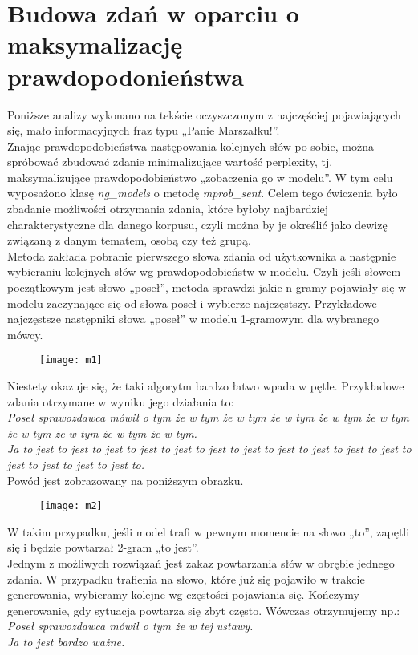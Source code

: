 \documentclass[a4paper,11pt,twoside]{report}
\theoremstyle{definition}
\begin{document}
\section{Budowa zdań w oparciu o maksymalizację prawdopodonieństwa}
Poniższe analizy wykonano na tekście oczyszczonym z najczęściej pojawiających się, mało informacyjnych fraz typu „Panie Marszałku!”. \\
Znając prawdopodobieństwa następowania kolejnych słów po sobie, można spróbować zbudować zdanie minimalizujące wartość perplexity, tj. maksymalizujące prawdopodobieństwo „zobaczenia go w modelu”. W tym celu wyposażono klasę \textit{ng\_models} o metodę \textit{mprob\_sent}. Celem tego ćwiczenia było zbadanie możliwości otrzymania zdania, które byłoby najbardziej charakterystyczne dla danego korpusu, czyli można by je określić jako dewizę związaną z danym tematem, osobą czy też grupą. \\
Metoda zakłada pobranie pierwszego słowa zdania od użytkownika a następnie wybieraniu kolejnych słów wg prawdopodobieństw w modelu. Czyli jeśli słowem początkowym jest słowo „poseł”, metoda sprawdzi jakie n-gramy pojawiały się w modelu zaczynające się od słowa poseł i wybierze najczęstszy. Przykładowe najczęstsze następniki słowa „poseł” w modelu 1-gramowym dla wybranego mówcy.\\

\begin{figure}[h] 
\texttt{[image: m1]} 
\centering
\end{figure}
 
Niestety okazuje się, że taki algorytm bardzo łatwo wpada w pętle. Przykładowe zdania otrzymane w wyniku jego działania to:\\
\textit{Poseł sprawozdawca mówił o tym że w tym że w tym że w tym że w tym że w tym że w tym że w tym że w tym że w tym.} \\
\textit{Ja to jest to jest to jest to jest to jest to jest to jest to jest to jest to jest to jest to jest to jest to jest to jest to.}\\
Powód jest zobrazowany na poniższym obrazku.
\begin{figure}[h] 
\texttt{[image: m2]} 
\centering
\end{figure}

W takim przypadku, jeśli model trafi w pewnym momencie na słowo „to”, zapętli się i będzie powtarzał 2-gram „to jest”. \\
Jednym z możliwych rozwiązań jest zakaz powtarzania słów w obrębie jednego zdania. W przypadku trafienia na słowo, które już się pojawiło w trakcie generowania, wybieramy kolejne wg częstości pojawiania się. Kończymy generowanie, gdy sytuacja powtarza się zbyt często. Wówczas otrzymujemy np.:\\
\textit{Poseł sprawozdawca mówił o tym że w tej ustawy.}\\
\textit{Ja to jest bardzo ważne.}
\end{document}
